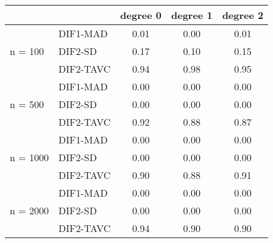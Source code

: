 \begin{tabular}{|l|l|c|c|c|}
  \hline
 &  & degree 0 & degree 1 & degree 2 \\ 
  \hline
 & DIF1-MAD & 0.01 & 0.00 & 0.01 \\ 
  n = 100 & DIF2-SD & 0.17 & 0.10 & 0.15 \\ 
   & DIF2-TAVC & 0.94 & 0.98 & 0.95 \\ 
   & DIF1-MAD & 0.00 & 0.00 & 0.00 \\ 
  n = 500 & DIF2-SD & 0.00 & 0.00 & 0.00 \\ 
   & DIF2-TAVC & 0.92 & 0.88 & 0.87 \\ 
   & DIF1-MAD & 0.00 & 0.00 & 0.00 \\ 
  n = 1000 & DIF2-SD & 0.00 & 0.00 & 0.00 \\ 
   & DIF2-TAVC & 0.90 & 0.88 & 0.91 \\ 
   & DIF1-MAD & 0.00 & 0.00 & 0.00 \\ 
  n = 2000 & DIF2-SD & 0.00 & 0.00 & 0.00 \\ 
   & DIF2-TAVC & 0.94 & 0.90 & 0.90 \\ 
   \hline
\end{tabular}

